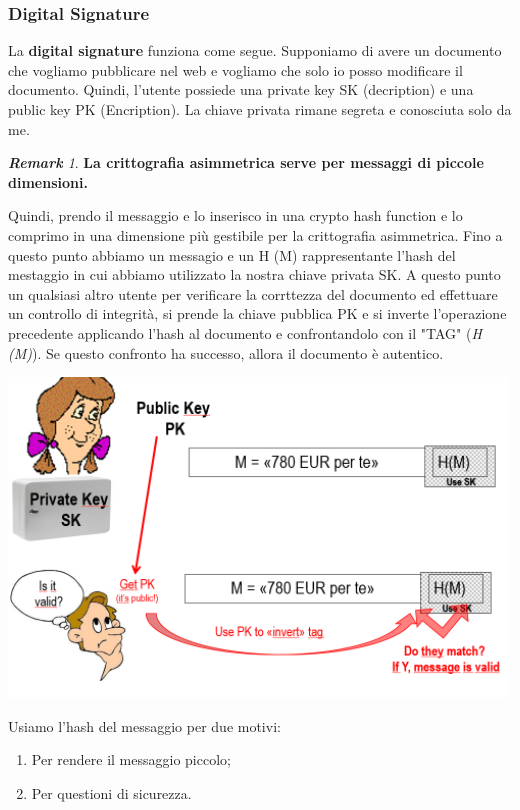 \documentclass{book}
\theoremstyle{remark}
\newtheorem*{remark}{\textbf{Remark}}
\begin{document}
\subsubsection{Digital Signature}
La \textbf{digital signature} funziona come segue\@. Supponiamo di avere un documento che vogliamo pubblicare nel web e vogliamo che solo io posso modificare il documento\@. Quindi, l'utente possiede una private key SK (decription) e una public key PK (Encription)\@. La chiave privata rimane segreta e conosciuta solo da me\@. \begin{remark}
	\textbf{La crittografia asimmetrica serve per messaggi di piccole dimensioni\@.}
\end{remark}
Quindi, prendo il messaggio e lo inserisco in una crypto hash function e lo comprimo in una dimensione più gestibile per la crittografia asimmetrica\@. Fino a questo punto abbiamo un messagio e un H (M) rappresentante l'hash del mestaggio in cui abbiamo utilizzato la nostra chiave privata SK\@.\newline
A questo punto un qualsiasi altro utente per verificare la corrttezza del documento ed effettuare un controllo di integrità, si prende la chiave pubblica PK e si inverte l'operazione precedente applicando l'hash al documento e confrontandolo con il "TAG" (\emph{H (M)})\@. Se questo confronto ha successo, allora il documento è autentico\@.
\begin{center}
	\includegraphics[scale=0.6]{2021-12-04-12-00-50.png}
\end{center}
Usiamo l'hash del messaggio per due motivi:\begin{enumerate}
	\item Per rendere il messaggio piccolo;\@
	\item Per questioni di sicurezza\@.
\end{enumerate}
\end{document}
